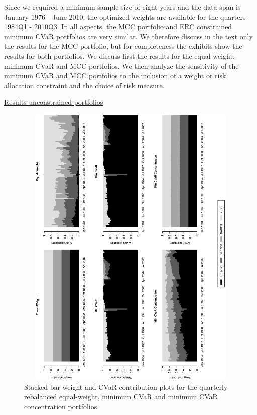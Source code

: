 \documentclass[12pt,a4paper]{article}
\begin{document}
Since we required a minimum sample size of eight years and the data span is January 1976 - June 2010, the optimized weights are available for the quarters 1984Q1 - 2010Q3.  In all aspects, the MCC portfolio and ERC constrained minimum CVaR portfolios are very similar. We therefore discuss in the text only the results for the MCC portfolio, but for completeness the exhibits show the results for both portfolios.
We discuss first the results for the equal-weight, minimum CVaR and MCC portfolios. We then analyze the sensitivity of the minimum CVaR and MCC portfolios to the inclusion of a weight or risk allocation constraint and the choice of risk measure.


\underline{Results unconstrained portfolios}

\begin{figure}[tb]
\begin{center}
\caption{Stacked bar weight and CVaR contribution plots for the quarterly rebalanced equal-weight, minimum CVaR and minimum CVaR concentration portfolios. \label{fig:weightcvar_allocation_dynamic}} \vspace{-1cm}
\includegraphics[width=12cm,height=14cm,angle=270]{stackedweightsriskcont_benchmark_CC.eps}
\end{center}
\end{figure}
\end{document}
